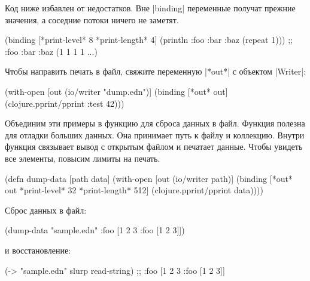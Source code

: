 Код ниже избавлен от недостатков. Вне \spverb|binding| переменные получат
прежние значения, а соседние потоки ничего не заметят.

\begin{english}
  \begin{clojure}
(binding [*print-level* 8
          *print-length* 4]
  (println {:foo {:bar {:baz (repeat 1)}}}))
;; {:foo {:bar {:baz (1 1 1 1 ...)}}}
  \end{clojure}
\end{english}

Чтобы направить печать в файл, свяжите переменную \spverb|*out*| с объектом
\spverb|Writer|:

\begin{english}
  \begin{clojure}
(with-open [out (io/writer "dump.edn")]
  (binding [*out* out]
    (clojure.pprint/pprint {:test 42})))
  \end{clojure}
\end{english}

Объединим эти примеры в функцию для сброса данных в файл. Функция полезна для
отладки больших данных. Она принимает путь к файлу и коллекцию. Внутри функция
связывает вывод с открытым файлом и печатает данные. Чтобы увидеть все элементы,
повысим лимиты на печать.

\begin{english}
  \begin{clojure}
(defn dump-data
  [path data]
  (with-open [out (io/writer path)]
    (binding [*out* out
              *print-level* 32
              *print-length* 512]
      (clojure.pprint/pprint data))))
  \end{clojure}
\end{english}

\noindent
Сброс данных в файл:

\begin{english}
  \begin{clojure}
(dump-data "sample.edn" {:foo [1 2 3 {:foo [1 2 3]}]})
  \end{clojure}
\end{english}

\noindent
и восстановление:

\begin{english}
  \begin{clojure}
(-> "sample.edn" slurp read-string)
;; {:foo [1 2 3 {:foo [1 2 3]}]}
  \end{clojure}
\end{english}

